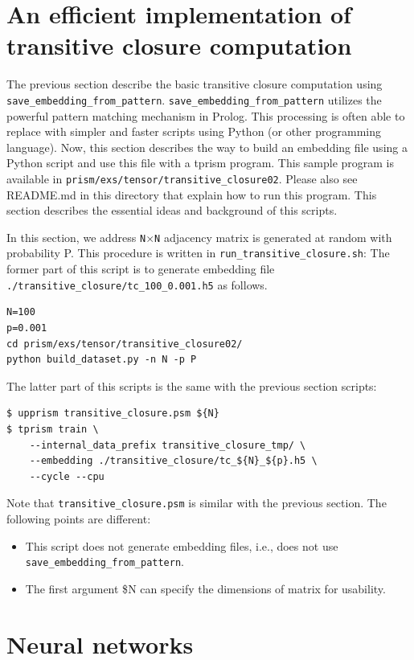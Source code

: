 \documentclass[a4paper]{report}
\begin{document}
\section{An efficient implementation of transitive closure computation}
\label{sec:transitive_closure02}

The previous section describe the basic transitive closure computation using 
{\tt save\_embedding\_from\_pattern}.
{\tt save\_embedding\_from\_pattern} utilizes the powerful pattern matching mechanism in Prolog.
This processing is often able to replace with simpler and faster scripts using Python (or other programming language).
Now, this section describes the way to build an embedding file using a Python script and use this file with a tprism program.
This sample program is available in \verb|prism/exs/tensor/transitive_closure02|.
Please also see README.md in this directory that explain how to run  this program.
This section describes the essential ideas and background of this scripts. 

In this section, we address {\tt N}$\times${\tt N} adjacency matrix is generated at random with probability P.
This procedure is written in {\tt run\_transitive\_closure.sh}:
The former part of this script is to generate embedding file {\tt ./transitive\_closure/tc\_100\_0.001.h5} as follows.
\begin{verbatim}
N=100
p=0.001
cd prism/exs/tensor/transitive_closure02/
python build_dataset.py -n N -p P
\end{verbatim}

The latter part of this scripts is the same with the previous section scripts:
\begin{verbatim}
$ upprism transitive_closure.psm ${N}
$ tprism train \
    --internal_data_prefix transitive_closure_tmp/ \
    --embedding ./transitive_closure/tc_${N}_${p}.h5 \
    --cycle --cpu
\end{verbatim}
Note that {\tt transitive\_closure.psm} is similar with the previous section.
The following points are different:
\begin{itemize}
	\item This script does not generate embedding files, i.e., does not use {\tt save\_embedding\_from\_pattern}.
	\item The first argument \${N} can specify the dimensions of matrix for usability.
\end{itemize}


\section{Neural networks}
\label{sec:nn}
\end{document}
